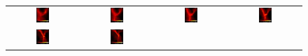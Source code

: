 \begin{figure}[htp]
\centering
\begin{tabular}{cccc}
	\includegraphics[width=0.2\textwidth]{Figures/sph_bates_starcluster_00.jpg} 
 &  \includegraphics[width=0.2\textwidth]{Figures/sph_bates_starcluster_01.jpg} 
 &  \includegraphics[width=0.2\textwidth]{Figures/sph_bates_starcluster_02.jpg}
 &  \includegraphics[width=0.2\textwidth]{Figures/sph_bates_starcluster_03.jpg}  
 \\
	\includegraphics[width=0.2\textwidth]{Figures/sph_bates_starcluster_04.jpg} 
 &  \includegraphics[width=0.2\textwidth]{Figures/sph_bates_starcluster_05.jpg} 

\end{tabular}
\end{figure}
